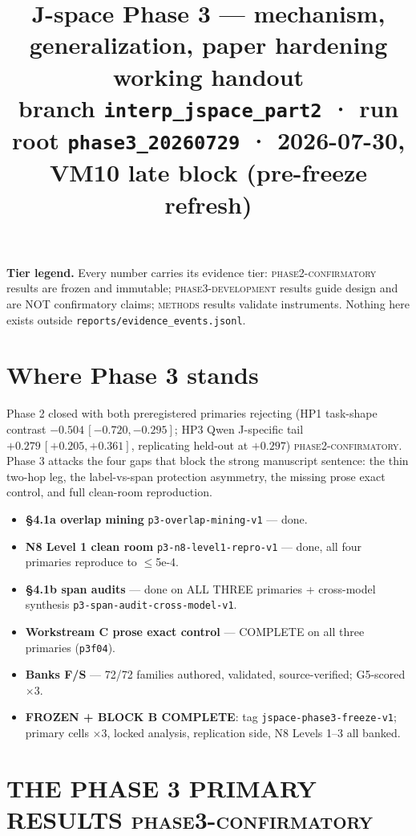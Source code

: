 \documentclass[10pt]{article}
\title{\vspace{-1.2em}J-space Phase 3 --- mechanism, generalization, paper hardening\\
\large working handout \\[2pt]
\normalsize\textcolor{muted}{branch \texttt{interp\_jspace\_part2} · run root \texttt{phase3\_20260729} · 2026-07-30, VM10 late block (pre-freeze refresh)}}
\author{}\date{}
\newcommand{\tier}[1]{\textcolor{muted}{\footnotesize\textsc{#1}}}
\newcommand{\eid}[1]{\textcolor{muted}{\footnotesize\texttt{#1}}}
\begin{document}
\maketitle
\vspace{-2.8em}

\noindent\textbf{Tier legend.} Every number carries its evidence tier:
\tier{phase2-confirmatory} results are frozen and immutable;
\tier{phase3-development} results guide design and are NOT confirmatory
claims; \tier{methods} results validate instruments. Nothing here exists
outside \texttt{reports/evidence\_events.jsonl}.

\section{Where Phase 3 stands}

Phase 2 closed with both preregistered primaries rejecting
(HP1 task-shape contrast $-0.504\,[-0.720,-0.295]$; HP3 Qwen J-specific
tail $+0.279\,[+0.205,+0.361]$, replicating held-out at $+0.297$)
\tier{phase2-confirmatory}. Phase 3 attacks the four gaps that block the
strong manuscript sentence: the thin two-hop leg, the label-vs-span
protection asymmetry, the missing prose exact control, and full
clean-room reproduction.

\begin{itemize}
\item \textbf{\S4.1a overlap mining} \eid{p3-overlap-mining-v1} --- done.
\item \textbf{N8 Level 1 clean room} \eid{p3-n8-level1-repro-v1} --- done, all four primaries reproduce to $\le$5e-4.
\item \textbf{\S4.1b span audits} --- done on ALL THREE primaries + cross-model synthesis \eid{p3-span-audit-cross-model-v1}.
\item \textbf{Workstream C prose exact control} --- COMPLETE on all three primaries (\texttt{p3f04}).
\item \textbf{Banks F/S} --- 72/72 families authored, validated, source-verified; G5-scored $\times$3.
\item \textbf{FROZEN + BLOCK B COMPLETE}: tag \texttt{jspace-phase3-freeze-v1}; primary cells $\times$3, locked analysis, replication side, N8 Levels 1--3 all banked.
\end{itemize}

\section{THE PHASE 3 PRIMARY RESULTS \hfill \tier{phase3-confirmatory}}
\end{document}
